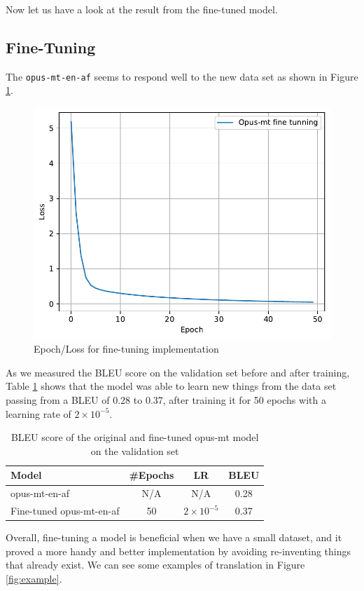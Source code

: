 Now let us have a look at the result from the fine-tuned model.

\subsection{Fine-Tuning}
The \texttt{opus-mt-en-af} seems to respond well to the new data set as shown in Figure \ref{fig:loss2}.
\begin{figure}[H]
	\centering
	\includegraphics[width=0.8\linewidth]{./figures/fine_tunning.pdf}
	\caption{Epoch/Loss for fine-tuning implementation}
	\label{fig:loss2}
\end{figure}

As we measured the BLEU score on the validation set before and after training, Table \ref{tab:fine} shows that the model was able to learn new things from the data set passing from a BLEU of 0.28 to 0.37, after training it for 50 epochs with a learning rate of $2\times 10 ^{-5}$.

\begin{table}
	\centering
	\begin{tabular}{lccc}
		\toprule
		Model                 & \#Epochs & LR              & BLEU \\
		\midrule
		opus-mt-en-af         & N/A      & N/A             & 0.28 \\
		Fine-tuned opus-mt-en-af & 50      & $2\times10^{-5}$ & 0.37 \\
		\bottomrule
	\end{tabular}
	\caption{BLEU score of the original and fine-tuned opus-mt model on the validation set}
	\label{tab:fine}
\end{table}
Overall,  fine-tuning a model is beneficial when we have a small dataset, and it proved a more handy and better implementation by avoiding re-inventing things that already exist. We can see some examples of translation in Figure \ref{fig:example}.

